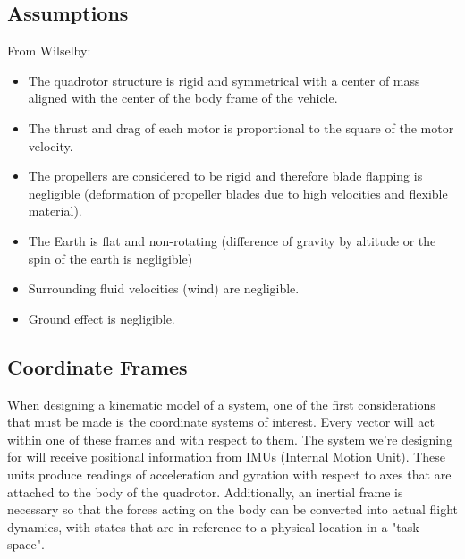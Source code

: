 \documentclass[conf]{new-aiaa}
\begin{document}
\subsection{Assumptions}
From Wilselby:
\begin{itemize}
    \item The quadrotor structure is rigid and symmetrical with a center of mass aligned with the center of the body frame of the vehicle.
    \item The thrust and drag of each motor is proportional to the square of the motor velocity.
    \item The propellers are considered to be rigid and therefore blade flapping is negligible (deformation of propeller blades due to high velocities and flexible material).
    \item The Earth is flat and non-rotating (difference of gravity by altitude or the spin of the earth is negligible)
    \item Surrounding fluid velocities (wind) are negligible.
    \item Ground effect is negligible.
\end{itemize}

\subsection{Coordinate Frames}
{When designing a kinematic model of a system, one of the first considerations that must be made is the coordinate systems of interest. Every vector will act within one of these frames and with respect to them. The system we're designing for will receive positional information from IMUs (Internal Motion Unit). These units produce readings of acceleration and gyration with respect to axes that are attached to the body of the quadrotor. Additionally, an inertial frame is necessary so that the forces acting on the body can be converted into actual flight dynamics, with states that are in reference to a physical location in a "task space". } 
\end{document}
